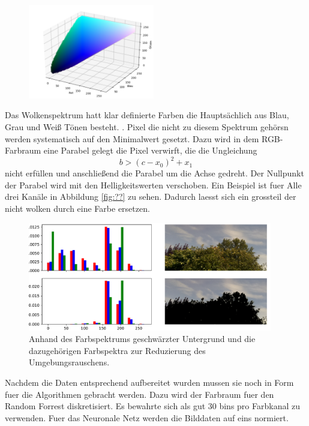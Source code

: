 \begin{figure}
		\centering
		\includegraphics[width=0.49\textwidth]{pictures/cut_cube.pdf}
\caption{}
\label{fig:}
\end{figure}
Das Wolkenspektrum hatt klar definierte Farben die Hauptsächlich aus Blau, Grau
und Weiß Tönen besteht. .
Pixel die nicht zu diesem Spektrum gehörsn werden systematisch auf den
Minimalwert gesetzt.
Dazu wird in dem RGB-Farbraum eine Parabel gelegt die Pixel verwirft, die die
Ungleichung 
\begin{equation}
		b > (c - x_0)^2 + x_1
\end{equation}
nicht erfüllen und anschließend die Parabel um die Achse gedreht.
Der Nullpunkt der Parabel wird mit den Helligkeitswerten verschoben.
Ein Beispiel ist fuer Alle  drei Kanäle in Abbildung \ref{fig:??} zu sehen.
Dadurch laesst sich ein grossteil der nicht wolken durch eine Farbe ersetzen.
\begin{figure}
		\centering
		\includegraphics[width=0.95\textwidth]{pictures/cut_hist.pdf}
		\caption{Anhand des Farbspektrums geschwärzter Untergrund und die
		dazugehörigen Farbspektra zur Reduzierung des Umgebungsrauschens.}
		\label{fig:name}
\end{figure}

Nachdem die Daten entsprechend aufbereitet wurden mussen sie noch in Form fuer
die Algorithmen gebracht werden. 
Dazu wird der Farbraum fuer den Random Forrest diskretisiert.
Es bewahrte sich als gut 30 bins pro Farbkanal zu verwenden.
Fuer das Neuronale Netz werden die Bilddaten auf eins normiert.

